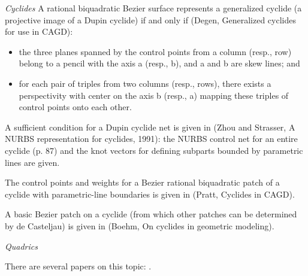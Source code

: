 {\em Cyclides}
	A rational biquadratic Bezier surface represents a generalized
	cyclide (a projective image of a Dupin cyclide) if and only if
	(Degen, Generalized cyclides for use in CAGD):
\begin{itemize}
\item
	the three planes spanned by the control points from a column
	(resp., row) belong to a pencil with the axis a (resp., b),
	and a and b are skew lines; and
\item	
	for each pair of triples from two columns (resp., rows),
	there exists a perspectivity with center on the axis b (resp., a)
	mapping these triples of control points onto each other.
\end{itemize}

	A sufficient condition for a Dupin cyclide net is given in 
	(Zhou and Strasser, A NURBS representation for cyclides, 1991):
	the NURBS control net for an entire cyclide (p. 87)
	and the knot vectors for defining subparts bounded by parametric lines
	are given.

	The control points and weights for a Bezier rational
	biquadratic patch of a cyclide with parametric-line boundaries
	is given in (Pratt, Cyclides in CAGD).

	A basic Bezier patch on a cyclide (from which other patches
	can be determined by de Casteljau) is given in 
	(Boehm, On cyclides in geometric modeling).

{\em Quadrics}

There are several papers on this topic: \cite{Dietz93,Boehm93,Hoschek-Seemann92,Boehm-Hansford92,Hoschek92,Wang92,Teller91,Boehm91,Lodha90,Dahmen89,Cobb88,Farin87,Piegl87,Piegl85,Seder85,Goldman83}.

